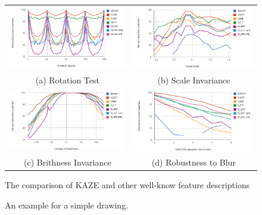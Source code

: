\begin{figure}[htsb]
\begin{tabular}{cc}
  \includegraphics[width=75mm]{figures/Rotation_KAZE} &   \includegraphics[width=75mm]{figures/Scale_KAZE} \\
(a) Rotation Test & (b) Scale Invariance \\[6pt]
 \includegraphics[width=75mm]{figures/Brightness_KAZE} &   \includegraphics[width=75mm]{figures/Blur_KAZE} \\
(c) Brithness Invariance & (d) Robustness to Blur \\[6pt]
\end{tabular}
\caption{The comparison of KAZE and other well-know feature descriptions}\label{fig:compare_kaze}
\end{figure}



\begin{figure}[htsb]
  \centering
  \caption[Example drawing]{An example for a simple drawing.}\label{fig:sample-drawing}
\end{figure}

